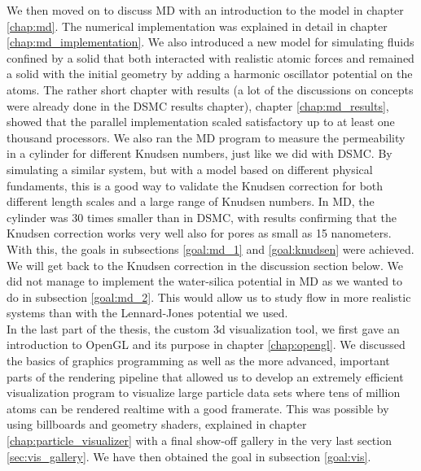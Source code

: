 We then moved on to discuss MD with an introduction to the model in chapter \ref{chap:md}. The numerical implementation was explained in detail in chapter \ref{chap:md_implementation}. We also introduced a new model for simulating fluids confined by a solid that both interacted with realistic atomic forces and remained a solid with the initial geometry by adding a harmonic oscillator potential on the atoms. The rather short chapter with results (a lot of the discussions on concepts were already done in the DSMC results chapter), chapter \ref{chap:md_results}, showed that the parallel implementation scaled satisfactory up to at least one thousand processors. We also ran the MD program to measure the permeability in a cylinder for different Knudsen numbers, just like we did with DSMC. By simulating a similar system, but with a model based on different physical fundaments, this is a good way to validate the Knudsen correction for both different length scales and a large range of Knudsen numbers. In MD, the cylinder was 30 times smaller than in DSMC, with results confirming that the Knudsen correction works very well also for pores as small as 15 nanometers. With this, the goals in subsections \ref{goal:md_1} and \ref{goal:knudsen} were achieved. We will get back to the Knudsen correction in the discussion section below. We did not manage to implement the water-silica potential in MD as we wanted to do in subsection \ref{goal:md_2}. This would allow us to study flow in more realistic systems than with the Lennard-Jones potential we used.
\\
In the last part of the thesis, the custom 3d visualization tool, we first gave an introduction to OpenGL and its purpose in chapter \ref{chap:opengl}. We discussed the basics of graphics programming as well as the more advanced, important parts of the rendering pipeline that allowed us to develop an extremely efficient visualization program to visualize large particle data sets where tens of million atoms can be rendered realtime with a good framerate. This was possible by using billboards and geometry shaders, explained in chapter \ref{chap:particle_visualizer} with a final show-off gallery in the very last section \ref{sec:vis_gallery}. We have then obtained the goal in subsection \ref{goal:vis}.
